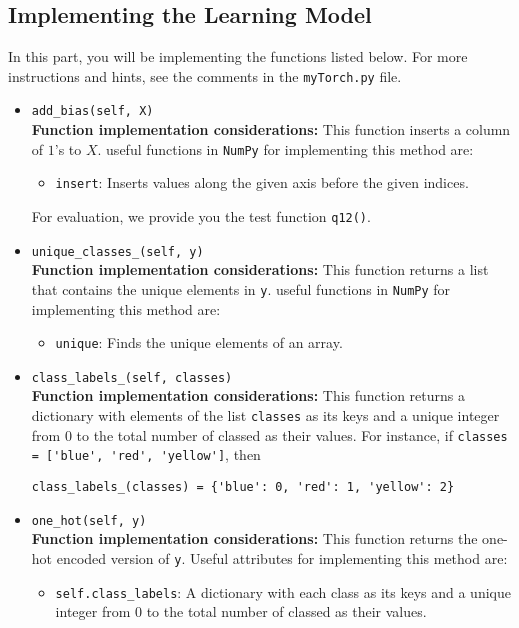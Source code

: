 \documentclass{article}
\theoremstyle{definition}
\begin{document}
\subsection{Implementing the Learning Model}
In this part, you will be implementing the functions listed below. For more instructions and hints, see the comments in the \verb|myTorch.py| file.
\begin{itemize}
	\item{\verb|add_bias(self, X)|\\\textbf{Function implementation considerations:}
		This function inserts a column of $1$'s to $X$. 
		useful functions in \verb|NumPy| for implementing this method are:
		\begin{itemize}
			\item \verb|insert|: Inserts values along the given axis before the given indices.
	\end{itemize}
	For evaluation, we provide you the test function \verb|q12()|.}
	\item{\verb|unique_classes_(self, y)|\\\textbf{Function implementation considerations:}
		This function returns a list that contains the unique elements in \verb|y|.
		useful functions in \verb|NumPy| for implementing this method are:
		\begin{itemize}
			\item \verb|unique|: Finds the unique elements of an array.
		\end{itemize}}
	\item{\verb|class_labels_(self, classes)|\\\textbf{Function implementation considerations:}
		This function returns a dictionary with elements of the list \verb|classes| as its keys and a unique integer from $0$ to the total number of classed as their values. For instance, if \verb|classes = ['blue', 'red', 'yellow']|, then 
		\begin{center}
			\verb|class_labels_(classes) = {'blue': 0, 'red': 1, 'yellow': 2}|
		\end{center}}
	\item{\verb|one_hot(self, y)|\\\textbf{Function implementation considerations:}
		This function returns the one-hot encoded version of \verb|y|.
		Useful attributes for implementing this method are:
		\begin{itemize}
			\item \verb|self.class_labels|: A dictionary with each class as its keys and a unique integer from $0$ to the total number of classed as their values.

\end{itemize}}
\end{itemize}
\end{document}
